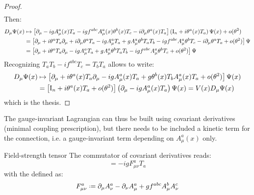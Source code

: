 \begin{proofbox}
\begin{proof}
\begin{equation*}
\begin{split}
      \end{split}
    \end{equation*}
    Then:
    \begin{equation*}
      \begin{split}
        D_\mu \Psi(x)
        & \mapsto \left[ \partial_\mu - i g A_\mu^a(x) T_a - i g f^{abc} A_\mu^a(x) \theta^b(x) T_c - i \partial_\mu \theta^a(x) T_a \right] \left( \mathrm{I}_n + i \theta^a(x) T_a \right) \Psi(x) + o(\theta^2) \\
        & = \left[ \partial_\mu + i \theta^a T_a \partial_\mu + i \partial_\mu \theta^a T_a - i g A_\mu^a T_a + g A_\mu^a \theta^b T_a T_b - i g f^{abc} A_\mu^a \theta^b T_c - i \partial_\mu \theta^a T_a + o(\theta^2) \right] \Psi \\
        & = \left[ \partial_\mu + i \theta^a T_a \partial_\mu - i g A_\mu^a T_a + g A_\mu^a \theta^b T_a T_b - i g f^{abc} A_\mu^a \theta^b T_c + o(\theta^2) \right] \Psi
      \end{split}
    \end{equation*}
    Recognizing $ T_a T_b - i f^{abc} T_c = T_b T_a $ allows to write:
    \begin{equation*}
      \begin{split}
        D_\mu \Psi(x)
        & \mapsto \left[ \partial_\mu + i \theta^a(x) T_a \partial_\mu - i g A_\mu^a(x) T_a + g \theta^b(x) T_b A_\mu^a(x) T_a + o(\theta^2) \right] \Psi(x) \\
        & = \left[ \mathrm{I}_n + i \theta^a(x) T_a + o(\theta^2) \right] \left( \partial_\mu - i g A_\mu^a(x) T_a \right) \Psi(x) = V(x) D_\mu \Psi(x)
      \end{split}
    \end{equation*}
    which is the thesis.
  \end{proof}
\end{proofbox}

The gauge-invariant Lagrangian can thus be built using covariant derivatives (minimal coupling prescription), but there needs to be included a kinetic term for the connection, i.e. a gauge-invariant term depending on $ A_\mu^a(x) $ only.

\begin{lemma}{Field-strength tensor}{}
  The commutator of covariant derivatives reads:
  \begin{equation}
    [D_\mu , D_\nu] = - i g F_{\mu \nu}^a T_a
  \end{equation}
  with the  defined as:
  \begin{equation}
    F_{\mu \nu}^a \defeq \pa_\mu A_\nu^a - \pa_\nu A_\mu^a + g f^{abc} A_\mu^b A_\nu^c
  \end{equation}
\end{lemma}

